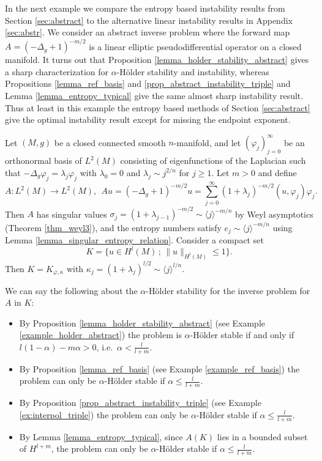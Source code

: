 \documentclass[12pt,twoside]{amsart}
\numberwithin{equation}{section}
\renewcommand{\leq}{\leqslant}
\renewcommand{\geq}{\geqslant}
\newcommand{\norm}[1]{\lVert #1 \rVert}         %
\newcommand{\br}[1]{\langle #1 \rangle}         %
\begin{document}
\begin{appendix}
In the next example we compare the entropy based instability results from Section \ref{sec:abstract} to the alternative linear instability results in Appendix \ref{sec:abstr}. We consider an abstract inverse problem where the forward map $A = (-\Delta_g+1)^{-m/2}$ is a linear elliptic pseudodifferential operator on a closed manifold. It turns out that Proposition \ref{lemma_holder_stability_abstract} gives a sharp characterization for $\alpha$-H\"older stability and instability, whereas Propositions \ref{lemma_ref_basis} and \ref{prop_abstract_instability_triple} and Lemma \ref{lemma_entropy_typical} give the same almost sharp instability result. Thus at least in this example the entropy based methods of Section \ref{sec:abstract} give the optimal instability result except for missing the endpoint exponent.

Let $(M,g)$ be a closed connected smooth $n$-manifold, and let $(\varphi_j)_{j=0}^{\infty}$ be an orthonormal basis of $L^2(M)$ consisting of eigenfunctions of the Laplacian such that $-\Delta_g \varphi_j = \lambda_j \varphi_j$ with $\lambda_0 = 0$ and $\lambda_j \sim j^{2/n}$ for $j \geq 1$. Let $m > 0$ and define 
\[
A: L^2(M) \to L^2(M), \ \ A u = (-\Delta_g+1)^{-m/2} u = \sum_{j=0}^{\infty} (1+\lambda_j)^{-m/2} (u,\varphi_j) \varphi_j.
\]
Then $A$ has singular values $\sigma_j = (1+\lambda_{j-1})^{-m/2} \sim \br{j}^{-m/n}$ by Weyl asymptotics (Theorem \ref{thm_weyl3}), and the entropy numbers satisfy $e_j \sim \br{j}^{-m/n}$ using Lemma \ref{lemma_singular_entropy_relation}. Consider a compact set 
\[
K = \{ u \in H^l(M) \,;\, \norm{u}_{H^l(M)} \leq 1 \}.
\]
Then $K = K_{\varphi,\kappa}$ with $\kappa_j = (1+\lambda_j)^{l/2} \sim \br{j}^{l/n}$.

We can say the following about the $\alpha$-H\"older stability for the inverse problem for $A$ in $K$:

\begin{itemize}
\item 
By Proposition \ref{lemma_holder_stability_abstract} (see Example \ref{example_holder_abstract}) the problem is $\alpha$-H\"older stable if and only if $l(1-\alpha)-m\alpha > 0$, i.e.\ $\alpha < \frac{l}{l+m}$.
\item 
By Proposition \ref{lemma_ref_basis} (see Example \ref{example_ref_basis}) the problem can only be $\alpha$-H\"older stable if $\alpha \leq \frac{l}{l+m}$.
\item 
By Proposition \ref{prop_abstract_instability_triple} (see Example \ref{ex:interpol_triple}) the problem can only be $\alpha$-H\"older stable if $\alpha \leq \frac{l}{l+m}$.
\item 
By Lemma \ref{lemma_entropy_typical}, since $A(K)$ lies in a bounded subset of $H^{l+m}$, the problem can only be $\alpha$-H\"older stable if $\alpha \leq \frac{l}{l+m}$.
\end{itemize}






\end{appendix}
\end{document}

